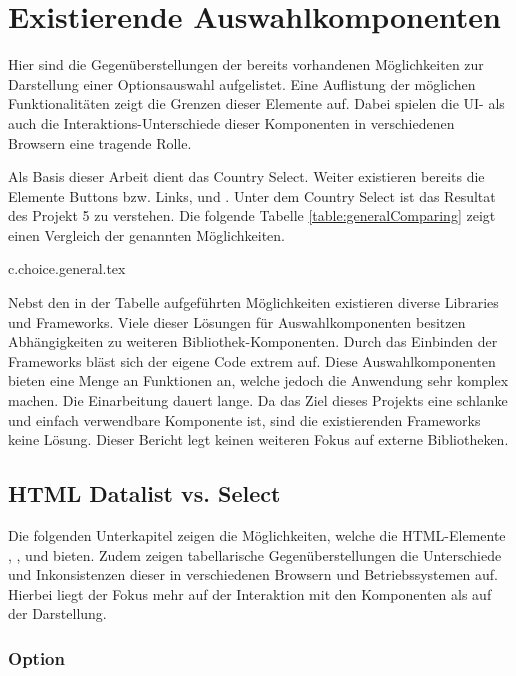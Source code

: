 \chapter{Existierende Auswahlkomponenten}
\label{chap:existingComponents}

Hier sind die Gegenüberstellungen der bereits vorhandenen Möglichkeiten zur Darstellung einer Optionsauswahl aufgelistet. 
Eine Auflistung der möglichen Funktionalitäten zeigt die Grenzen dieser Elemente auf. 
Dabei spielen die UI- als auch die Interaktions-Unterschiede dieser Komponenten in verschiedenen Browsern eine tragende Rolle. 

Als Basis dieser Arbeit dient das Country Select. 
Weiter existieren bereits die Elemente Buttons bzw. Links,  und . 
Unter dem Country Select ist das Resultat des Projekt 5 zu verstehen. 
Die folgende Tabelle \ref{table:generalComparing} zeigt einen Vergleich der genannten Möglichkeiten. 

{c.choice.general.tex}

Nebst den in der Tabelle aufgeführten Möglichkeiten existieren diverse Libraries und Frameworks. 
Viele dieser Lösungen für Auswahlkomponenten besitzen Abhängigkeiten zu weiteren Bibliothek-Komponenten. 
Durch das Einbinden der Frameworks bläst sich der eigene Code extrem auf. 
Diese Auswahlkomponenten bieten eine Menge an Funktionen an, welche jedoch die Anwendung sehr komplex machen. 
Die Einarbeitung dauert lange. 
Da das Ziel dieses Projekts eine schlanke und einfach verwendbare Komponente ist, sind die existierenden Frameworks keine Lösung. 
Dieser Bericht legt keinen weiteren Fokus auf externe Bibliotheken. 


\section{HTML Datalist vs. Select}
\label{sec:datalistSelect}

Die folgenden Unterkapitel zeigen die Möglichkeiten, welche die HTML-Elemente , ,  und  bieten. 
Zudem zeigen tabellarische Gegenüberstellungen die Unterschiede und Inkonsistenzen dieser in verschiedenen Browsern und Betriebssystemen auf. 
Hierbei liegt der Fokus mehr auf der Interaktion mit den Komponenten als auf der Darstellung. 


\subsection{Option}
\label{sec:option}

